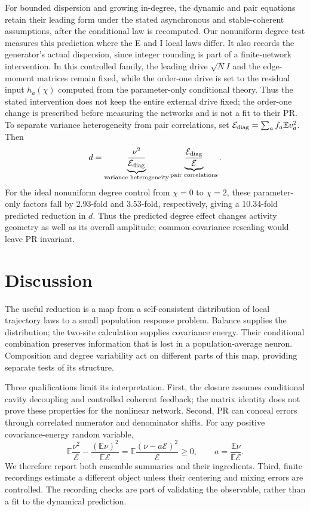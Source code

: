 \documentclass[11pt]{article}
\newcommand{\E}{\mathbb E}
\newcommand{\energy}{\mathcal E}
\begin{document}
For bounded dispersion and growing in-degree, the dynamic and pair equations
retain their leading form under the stated asynchronous and stable-coherent
assumptions, after the conditional law is recomputed. Our nonuniform degree
test measures this prediction where the E and I local laws differ. It also
records the generator's actual dispersion, since integer rounding is part
of a finite-network intervention.
In this controlled family, the leading drive $\sqrt N I$ and the edge-moment
matrices remain fixed, while the order-one drive is set to the residual
input $h_a(\chi)$ computed from the parameter-only conditional theory. Thus
the stated intervention does not keep the entire external drive fixed; the
order-one change is prescribed before measuring the networks and is not a
fit to their PR.
To separate variance heterogeneity from pair correlations, set
$\energy_{\rm diag}=\sum_af_a\E v_a^2$. Then
\begin{equation}
 d=\underbrace{\frac{\nu^2}{\energy_{\rm diag}}}
                 _{\text{variance heterogeneity}}
   \underbrace{\frac{\energy_{\rm diag}}{\energy}}
                 _{\text{pair correlations}}.
 \label{eq:degreefactors}
\end{equation}
For the ideal nonuniform degree control from $\chi=0$ to $\chi=2$, these
parameter-only factors fall by 2.93-fold and 3.53-fold, respectively, giving
a 10.34-fold predicted reduction in $d$. Thus the predicted degree effect
changes activity geometry as well as its overall amplitude; common covariance
rescaling would leave PR invariant.



\section{Discussion}

The useful reduction is a map from a self-consistent distribution of local
trajectory laws to a small population response problem. Balance supplies
the distribution; the two-site calculation supplies covariance energy.
Their conditional combination preserves information that is lost in a
population-average neuron. Composition and degree variability act on
different parts of this map, providing separate tests of its structure.

Three qualifications limit its interpretation. First, the closure assumes
conditional cavity decoupling and controlled coherent feedback; the matrix
identity does not prove these properties for the nonlinear network. Second,
PR can conceal errors through correlated numerator and denominator shifts.
For any positive covariance-energy random variable,
\begin{equation}
 \E\frac{\nu^2}{\energy}-\frac{(\E\nu)^2}{\E\energy}
 =\E\frac{(\nu-a\energy)^2}{\energy}\geq0,\qquad
 a=\frac{\E\nu}{\E\energy}.
 \label{eq:ratiobias}
\end{equation}
We therefore report both ensemble summaries and their ingredients. Third,
finite recordings estimate a different object unless their centering and
mixing errors are controlled. The recording checks are part of validating
the observable, rather than a fit to the dynamical prediction.
\end{document}
